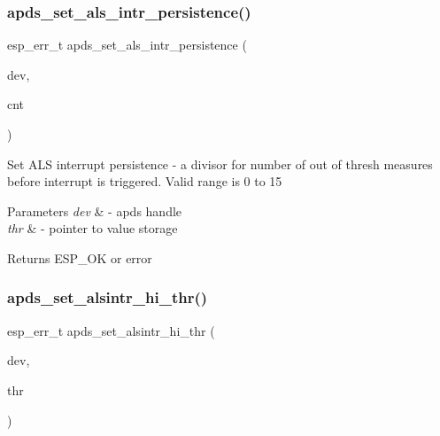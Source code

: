 \subsubsection{\texorpdfstring{apds\+\_\+set\+\_\+als\+\_\+intr\+\_\+persistence()}{apds\_set\_als\_intr\_persistence()}}
{\footnotesize\ttfamily esp\+\_\+err\+\_\+t apds\+\_\+set\+\_\+als\+\_\+intr\+\_\+persistence (\begin{DoxyParamCaption}\item[{\hyperlink{structAPDS9960__Driver}{A\+P\+D\+S\+\_\+\+D\+EV}}]{dev,  }\item[{\hyperlink{vl53l0x__types_8h_aba7bc1797add20fe3efdf37ced1182c5}{uint8\+\_\+t} $\ast$}]{cnt }\end{DoxyParamCaption})}




\begin{DoxyItemize}
\item Set A\+LS interrupt persistence -\/ a divisor for number of out of thresh measures before interrupt is triggered. Valid range is 0 to 15 
\end{DoxyItemize}


\begin{DoxyParams}{Parameters}
{\em dev} & -\/ apds handle \\
\hline
{\em thr} & -\/ pointer to value storage \\
\hline
\end{DoxyParams}
\begin{DoxyReturn}{Returns}
E\+S\+P\+\_\+\+OK or error 
\end{DoxyReturn}
\mbox{\label{group__APDS9960__ALSFunctions_gab2e43323eca1802727570bb71bcef1cd}} 
\subsubsection{\texorpdfstring{apds\+\_\+set\+\_\+alsintr\+\_\+hi\+\_\+thr()}{apds\_set\_alsintr\_hi\_thr()}}
{\footnotesize\ttfamily esp\+\_\+err\+\_\+t apds\+\_\+set\+\_\+alsintr\+\_\+hi\+\_\+thr (\begin{DoxyParamCaption}\item[{\hyperlink{structAPDS9960__Driver}{A\+P\+D\+S\+\_\+\+D\+EV}}]{dev,  }\item[{\hyperlink{vl53l0x__types_8h_a273cf69d639a59973b6019625df33e30}{uint16\+\_\+t} $\ast$}]{thr }\end{DoxyParamCaption})}




